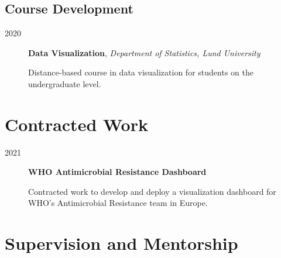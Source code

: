 \documentclass[
  10pt,
  headsepline=true,
  english,
  DIV=12
]{scrartcl}
\renewcommand*{%
  \mkbibnamegiven
}[1]{\ifitemannotation{highlight}{\textbf{#1}}{#1}}
\renewcommand*{%
  \mkbibnamefamily
}[1]{\ifitemannotation{highlight}{\textbf{#1}}{#1}}
\begin{document}
\subsection{Course Development}

\begin{description}
  \item[2020]{
              \textbf{Data Visualization}, \emph{Department of Statistics, Lund
                University}

              Distance-based course in data visualization for students on
              the undergraduate level.
        }
\end{description}

\section{Contracted Work}

\begin{description}
  \item[2021]{
              \textbf{WHO Antimicrobial Resistance Dashboard}

              Contracted work to develop and deploy a visualization dashboard for
              WHO's Antimicrobial Resistance team in Europe.
        }
\end{description}

\section{Supervision and Mentorship}
\end{document}
